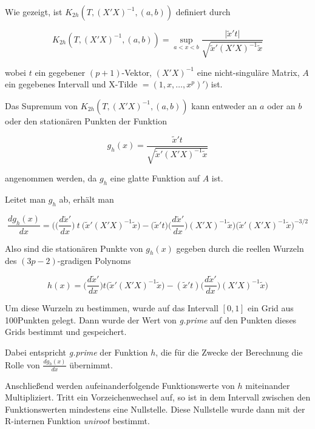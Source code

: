 \documentclass[12pt,a4paper]{article}
\theoremstyle{definition}
\theoremstyle{definition}
\theoremstyle{definition}
\newcommand{\ngridpoly}{100}
\begin{document}
Wie gezeigt, ist $K_{2h}(T,(X'X)^{-1},(a,b))$ definiert durch

\begin{equation*}
K_{2h}(T,(X'X)^{-1},(a,b)) = \sup_{a<x<b} \frac{\vert \tilde{x}' t \vert}{\sqrt{\tilde{x}'(X'X)^{-1}\tilde{x}}}
\end{equation*}

wobei $t$ ein gegebener $(p+1)$-Vektor, $(X'X)^{-1}$ eine nicht-singuläre Matrix, $A$ ein gegebenes Intervall und \gls{X-Tilde} $= (1, x, \ldots, x^p)')$ ist. 

Das Supremum von $K_{2h}(T,(X'X)^{-1},(a,b))$ kann entweder an $a$ oder an $b$ oder den stationären Punkten der Funktion

\begin{equation*}
g_h(x) = \frac{\tilde{x}'t}{\sqrt{\tilde{x}'(X'X)^{-1}\tilde{x}}}
\end{equation*}

angenommen werden, da $g_h$ eine glatte Funktion auf $A$ ist.

Leitet man $g_h$ ab, erhält man

\begin{equation*}
\frac{d g_h(x)}{dx} = \bigg ( \big ( \frac{d\tilde{x}'}{dx} \big) ~ t ~ \big ( \tilde{x}'(X'X)^{-1}\tilde{x} \big ) - \big ( \tilde{x}'t \big ) \big ( \frac{d\tilde{x}'}{dx} \big ) (X'X)^{-1} \tilde{x} \bigg ) \bigg ( \tilde{x}'(X'X)^{-1}\tilde{x} \bigg )^{-3/2}
\end{equation*}

Also sind die stationären Punkte von $g_h(x)$ gegeben durch die reellen Wurzeln des $(3p-2)$-gradigen Polynoms

\begin{equation*}
h(x) = \big(\frac{d\tilde{x}'}{dx}\big) t \big( \tilde{x}'(X'X)^{-1}\tilde{x} \big) - (\tilde{x}'t) \big(\frac{d\tilde{x}'}{dx}\big) (X'X)^{-1} \tilde{x})
\end{equation*}

Um diese Wurzeln zu bestimmen, wurde auf das Intervall $[0,1]$ ein Grid aus \ngridpoly Punkten gelegt. Dann wurde der Wert von \textit{g.prime} auf den Punkten dieses Grids bestimmt und gespeichert. 

Dabei entspricht \textit{g.prime} der Funktion $h$, die für die Zwecke der Berechnung die Rolle von $\frac{d g_h(x)}{dx}$ übernimmt.

Anschließend werden aufeinanderfolgende Funktionswerte von $h$ miteinander Multipliziert. Tritt ein Vorzeichenwechsel auf, so ist in dem Intervall zwischen den Funktionswerten mindestens eine Nullstelle. Diese Nullstelle wurde dann mit der R-internen Funktion \textit{uniroot} bestimmt.
\end{document}
